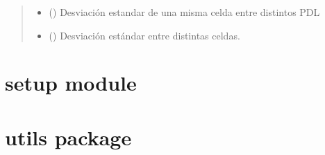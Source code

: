 \documentclass[letterpaper,10pt,english]{sphinxmanual}
\begin{document}
\begin{fulllineitems}
\begin{quote}
\begin{description}
\begin{itemize}
\item {} 
\sphinxAtStartPar
{} (\sphinxstyleliteralemphasis{\sphinxupquote{, }}) \textendash{} Desviación estandar de una misma celda entre distintos PDL

\item {} 
\sphinxAtStartPar
{} (\sphinxstyleliteralemphasis{\sphinxupquote{, }}) \textendash{} Desviación estándar entre distintas celdas.

\end{itemize}

\end{description}\end{quote}

\end{fulllineitems}


\sphinxstepscope


\chapter{setup module}
\label{\detokenize{setup:setup-module}}\label{\detokenize{setup::doc}}
\sphinxstepscope


\chapter{utils package}
\label{\detokenize{utils:module-utils}}\label{\detokenize{utils:utils-package}}\label{\detokenize{utils::doc}}
\end{document}
